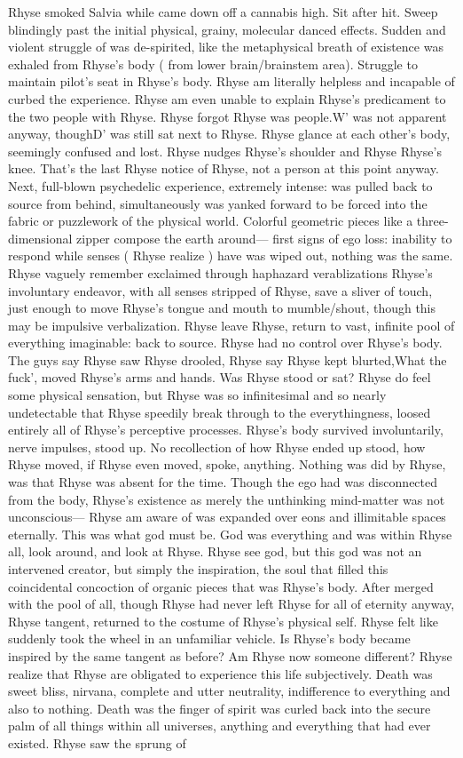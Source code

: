 \documentclass[12pt]{book}
\begin{document}
Rhyse smoked Salvia while came down off a cannabis high. Sit after hit. Sweep blindingly past the initial physical, grainy, molecular danced effects. Sudden and violent struggle of was de-spirited, like the metaphysical breath of existence was exhaled from Rhyse's body ( from lower brain/brainstem area). Struggle to maintain pilot's seat in Rhyse's body. Rhyse am literally helpless and incapable of curbed the experience. Rhyse am even unable to explain Rhyse's predicament to the two people with Rhyse. Rhyse forgot Rhyse was people.W' was not apparent anyway, thoughD' was still sat next to Rhyse. Rhyse glance at each other's body, seemingly confused and lost. Rhyse nudges Rhyse's shoulder and Rhyse Rhyse's knee. That's the last Rhyse notice of Rhyse, not a person at this point anyway. Next, full-blown psychedelic experience, extremely intense: was pulled back to source from behind, simultaneously was yanked forward to be forced into the fabric or puzzlework of the physical world. Colorful geometric pieces like a three-dimensional zipper compose the earth around--- first signs of ego loss: inability to respond while senses ( Rhyse realize ) have was wiped out, nothing was the same. Rhyse vaguely remember exclaimed through haphazard verablizations Rhyse's involuntary endeavor, with all senses stripped of Rhyse, save a sliver of touch, just enough to move Rhyse's tongue and mouth to mumble/shout, though this may be impulsive verbalization. Rhyse leave Rhyse, return to vast, infinite pool of everything imaginable: back to source. Rhyse had no control over Rhyse's body. The guys say Rhyse saw Rhyse drooled, Rhyse say Rhyse kept blurted,What the fuck', moved Rhyse's arms and hands. Was Rhyse stood or sat? Rhyse do feel some physical sensation, but Rhyse was so infinitesimal and so nearly undetectable that Rhyse speedily break through to the everythingness, loosed entirely all of Rhyse's perceptive processes. Rhyse's body survived involuntarily, nerve impulses, stood up. No recollection of how Rhyse ended up stood, how Rhyse moved, if Rhyse even moved, spoke, anything. Nothing was did by Rhyse, was that Rhyse was absent for the time. Though the ego had was disconnected from the body, Rhyse's existence as merely the unthinking mind-matter was not unconscious--- Rhyse am aware of was expanded over eons and illimitable spaces eternally. This was what god must be. God was everything and was within Rhyse all, look around, and look at Rhyse. Rhyse see god, but this god was not an intervened creator, but simply the inspiration, the soul that filled this coincidental concoction of organic pieces that was Rhyse's body. After merged with the pool of all, though Rhyse had never left Rhyse for all of eternity anyway, Rhyse tangent, returned to the costume of Rhyse's physical self. Rhyse felt like suddenly took the wheel in an unfamiliar vehicle. Is Rhyse's body became inspired by the same tangent as before? Am Rhyse now someone different? Rhyse realize that Rhyse are obligated to experience this life subjectively. Death was sweet bliss, nirvana, complete and utter neutrality, indifference to everything and also to nothing. Death was the finger of spirit was curled back into the secure palm of all things within all universes, anything and everything that had ever existed. Rhyse saw the sprung of 
\end{document}
